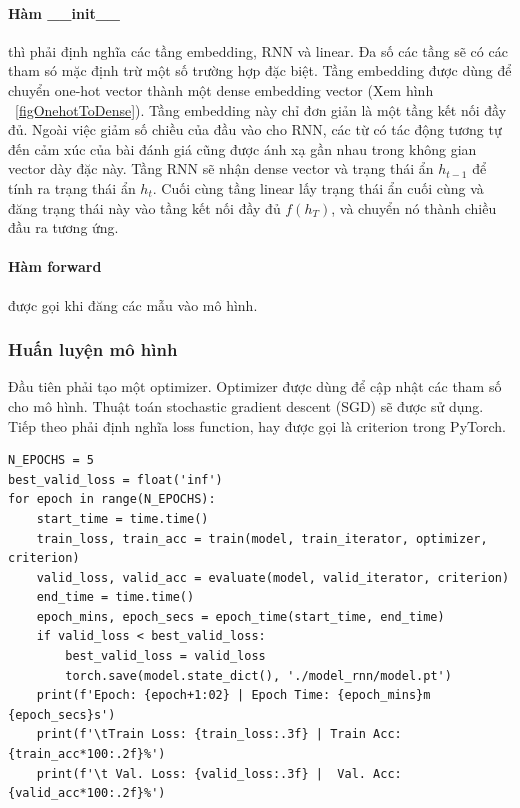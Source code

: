 \documentclass[runningheads]{llncs}
\begin{document}
\paragraph{Hàm \_\_init\_\_} thì phải định nghĩa các tầng embedding, RNN và linear. Đa số các tầng sẽ có các tham só mặc định trừ một số trường hợp đặc biệt.
Tầng embedding được dùng để chuyển one-hot vector thành một dense embedding vector (Xem hình ~\ref{figOnehotToDense}). Tầng embedding này chỉ đơn giản là một tầng kết nối đầy đủ. Ngoài việc giảm số chiều của đầu vào cho RNN, các từ có tác động tương tự đến cảm xúc của bài đánh giá cũng được ánh xạ gần nhau trong không gian vector dày đặc này. 
Tầng RNN sẽ nhận dense vector và trạng thái ẩn \textit{$h_{t-1}$} để tính ra trạng thái ẩn \textit{$h_{t}$}. Cuối cùng tầng linear lấy trạng thái ẩn cuối cùng và đăng trạng thái này vào tầng kết nối đầy đủ \textit{$f(h_T)$}, và chuyển nó thành chiều đầu ra tương ứng.

\paragraph{Hàm forward} được gọi khi đăng các mẫu vào mô hình.

\subsubsection{Huấn luyện mô hình}

Đầu tiên phải tạo một optimizer. Optimizer được dùng để cập nhật các tham số cho mô hình. Thuật toán stochastic gradient descent (SGD) sẽ được sử dụng.
Tiếp theo phải định nghĩa loss function, hay được gọi là criterion trong PyTorch.

\begin{lstlisting}
N_EPOCHS = 5
best_valid_loss = float('inf')
for epoch in range(N_EPOCHS):
    start_time = time.time()    
    train_loss, train_acc = train(model, train_iterator, optimizer, criterion)
    valid_loss, valid_acc = evaluate(model, valid_iterator, criterion)    
    end_time = time.time()
    epoch_mins, epoch_secs = epoch_time(start_time, end_time)    
    if valid_loss < best_valid_loss:
        best_valid_loss = valid_loss
        torch.save(model.state_dict(), './model_rnn/model.pt')    
    print(f'Epoch: {epoch+1:02} | Epoch Time: {epoch_mins}m {epoch_secs}s')
    print(f'\tTrain Loss: {train_loss:.3f} | Train Acc: {train_acc*100:.2f}%')
    print(f'\t Val. Loss: {valid_loss:.3f} |  Val. Acc: {valid_acc*100:.2f}%')
\end{lstlisting}
\end{document}
